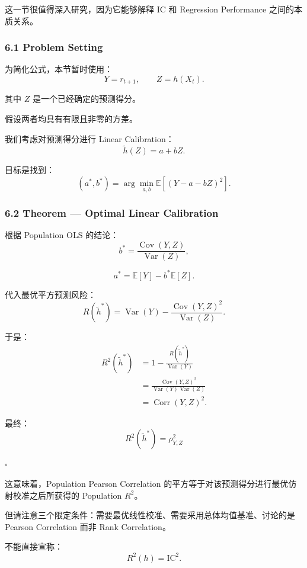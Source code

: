 这一节很值得深入研究，因为它能够解释 IC 和 Regression Performance 之间的本质关系。

\hypertarget{part-4-63-0001-problem-setting}{%
\subsubsection{6.1 Problem Setting}\label{part-4-63-0001-problem-setting}}

为简化公式，本节暂时使用：
\[Y=r_{t+1},
\qquad
Z=h(X_t).\]

其中 \(Z\) 是一个已经确定的预测得分。

假设两者均具有有限且非零的方差。

我们考虑对预测得分进行 Linear Calibration：
\[\tilde h(Z)=a+bZ.\]

目标是找到：
\[(a^*,b^*)
=
\arg\min_{a,b}
\mathbb E[(Y-a-bZ)^2].\]

\hypertarget{part-4-63-0001-theorem-optimal-linear-calibration}{%
\subsubsection{6.2 Theorem --- Optimal Linear Calibration}\label{part-4-63-0001-theorem-optimal-linear-calibration}}

根据 Population OLS 的结论：
\[b^*
=
\frac{\operatorname{Cov}(Y,Z)}
{\operatorname{Var}(Z)},\]

\[a^*
=
\mathbb E[Y]-b^*\mathbb E[Z].\]

代入最优平方预测风险：
\[R(\tilde h^*)
=
\operatorname{Var}(Y)
-
\frac{\operatorname{Cov}(Y,Z)^2}
{\operatorname{Var}(Z)}.\]

于是：
\[\begin{aligned}
R^2(\tilde h^*)
&=
1-\frac{R(\tilde h^*)}{\operatorname{Var}(Y)}\\
&=
\frac{
\operatorname{Cov}(Y,Z)^2
}{
\operatorname{Var}(Y)\operatorname{Var}(Z)
}\\
&=
\operatorname{Corr}(Y,Z)^2.
\end{aligned}\]

最终：
\[\boxed{
R^2(\tilde h^*)=\rho_{Y,Z}^2
}\]

\(\square\)

这意味着，Population Pearson Correlation 的平方等于对该预测得分进行最优仿射校准之后所获得的 Population \(R^2\)。

但请注意三个限定条件：需要最优线性校准、需要采用总体均值基准、讨论的是 Pearson Correlation 而非 Rank Correlation。

不能直接宣称：
\[R^2(h)=\mathrm{IC}^2.\]

